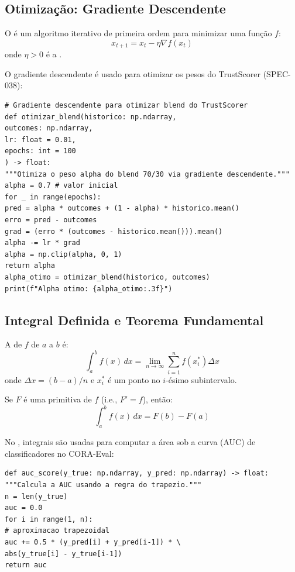 \subsection{Otimização: Gradiente Descendente}
\begin{definicao}
O  é um algoritmo iterativo de primeira
ordem para minimizar uma função $f$:
\[x_{t+1} = x_t - \eta \nabla f(x_t)
\]
onde $\eta > 0$ é a .
\end{definicao}
\begin{exemplo}
O gradiente descendente é usado para otimizar os pesos do TrustScorer
(SPEC-038):
\begin{lstlisting}[style=pythonstyle]
# Gradiente descendente para otimizar blend do TrustScorer
def otimizar_blend(historico: np.ndarray,
outcomes: np.ndarray,
lr: float = 0.01,
epochs: int = 100
) -> float:
"""Otimiza o peso alpha do blend 70/30 via gradiente descendente."""
alpha = 0.7 # valor inicial
for _ in range(epochs):
pred = alpha * outcomes + (1 - alpha) * historico.mean()
erro = pred - outcomes
grad = (erro * (outcomes - historico.mean())).mean()
alpha -= lr * grad
alpha = np.clip(alpha, 0, 1)
return alpha
alpha_otimo = otimizar_blend(historico, outcomes)
print(f"Alpha otimo: {alpha_otimo:.3f}")
\end{lstlisting}
\end{exemplo}
\subsection{Integral Definida e Teorema Fundamental}
\begin{definicao}
A  de $f$ de $a$ a $b$ é:
\[\int_a^b f(x) \, dx = \lim_{n \to \infty}
\sum_{i=1}^{n} f(x_i^*) \Delta x
\]
onde $\Delta x = (b-a)/n$ e $x_i^*$ é um ponto no $i$-ésimo subintervalo.
\end{definicao}
\begin{teorema}
Se $F$ é uma primitiva de $f$ (i.e., $F' = f$), então:
\[\int_a^b f(x) \, dx = F(b) - F(a)
\]
\end{teorema}
\begin{exemplo}
No \opencodeeco{}, integrais são usadas para computar a área sob a curva
(AUC) de classificadores no CORA-Eval:
\begin{lstlisting}[style=pythonstyle]
def auc_score(y_true: np.ndarray, y_pred: np.ndarray) -> float:
"""Calcula a AUC usando a regra do trapezio."""
n = len(y_true)
auc = 0.0
for i in range(1, n):
# aproximacao trapezoidal
auc += 0.5 * (y_pred[i] + y_pred[i-1]) * \
abs(y_true[i] - y_true[i-1])
return auc
\end{lstlisting}
\end{exemplo}
